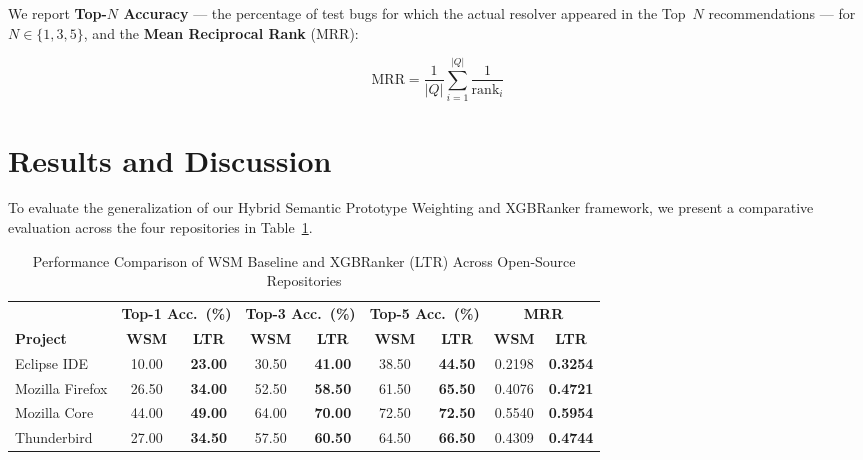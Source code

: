 \documentclass[sigconf,review,anonymous]{acmart}
\begin{document}
We report \textbf{Top-$N$ Accuracy} --- the percentage of test bugs for which
the actual resolver appeared in the Top~$N$ recommendations --- for
$N \in \{1, 3, 5\}$, and the \textbf{Mean Reciprocal Rank} (MRR):

\begin{equation}
\text{MRR} = \frac{1}{|Q|}\sum_{i=1}^{|Q|}\frac{1}{\text{rank}_i}
\label{eq:mrr}
\end{equation}

\section{Results and Discussion}

To evaluate the generalization of our Hybrid Semantic Prototype Weighting and XGBRanker framework, we present a comparative evaluation across the four repositories in Table~\ref{tab:multi_project_results}.

\begin{table}[t]
\centering
\caption{Performance Comparison of WSM Baseline and XGBRanker (LTR) Across Open-Source Repositories}
\label{tab:multi_project_results}
\renewcommand{\arraystretch}{1.2}
\begin{tabular}{lcccccccc}
\toprule
 & \multicolumn{2}{c}{\textbf{Top-1 Acc.\ (\%)}} & \multicolumn{2}{c}{\textbf{Top-3 Acc.\ (\%)}} & \multicolumn{2}{c}{\textbf{Top-5 Acc.\ (\%)}} & \multicolumn{2}{c}{\textbf{MRR}} \\
\cmidrule(lr){2-3} \cmidrule(lr){4-5} \cmidrule(lr){6-7} \cmidrule(lr){8-9}
\textbf{Project} & \textbf{WSM} & \textbf{LTR} & \textbf{WSM} & \textbf{LTR} & \textbf{WSM} & \textbf{LTR} & \textbf{WSM} & \textbf{LTR} \\
\midrule
Eclipse IDE & 10.00 & \textbf{23.00} & 30.50 & \textbf{41.00} & 38.50 & \textbf{44.50} & 0.2198 & \textbf{0.3254} \\
Mozilla Firefox & 26.50 & \textbf{34.00} & 52.50 & \textbf{58.50} & 61.50 & \textbf{65.50} & 0.4076 & \textbf{0.4721} \\
Mozilla Core & 44.00 & \textbf{49.00} & 64.00 & \textbf{70.00} & 72.50 & \textbf{72.50} & 0.5540 & \textbf{0.5954} \\
Thunderbird & 27.00 & \textbf{34.50} & 57.50 & \textbf{60.50} & 64.50 & \textbf{66.50} & 0.4309 & \textbf{0.4744} \\
\bottomrule
\end{tabular}
\end{table}
\end{document}
